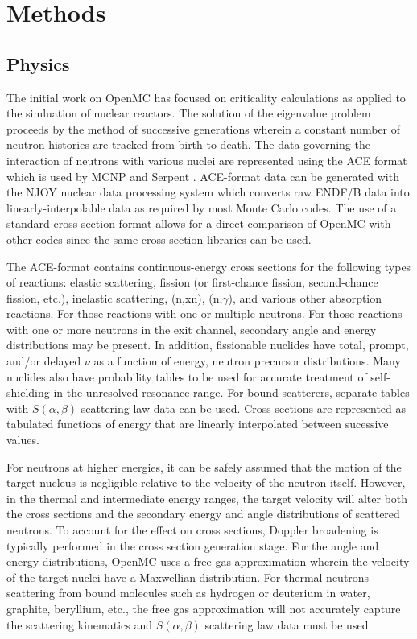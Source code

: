 \documentclass{elsarticle}
\begin{document}
\section{Methods}

\subsection{Physics}

The initial work on OpenMC has focused on criticality calculations as applied to
the simluation of nuclear reactors. The solution of the eigenvalue problem
proceeds by the method of successive generations \cite{lieberoth} wherein a
constant number of neutron histories are tracked from birth to death. The data
governing the interaction of neutrons with various nuclei are represented using
the ACE format \cite{ace-format} which is used by MCNP \cite{mcnp} and Serpent
\cite{serpent}. ACE-format data can be generated with the NJOY nuclear data
processing system which converts raw ENDF/B data into linearly-interpolable data
as required by most Monte Carlo codes. The use of a standard cross section
format allows for a direct comparison of OpenMC with other codes since the same
cross section libraries can be used.

The ACE-format contains continuous-energy cross sections for the following types
of reactions: elastic scattering, fission (or first-chance fission,
second-chance fission, etc.), inelastic scattering, (n,xn), (n,$\gamma$), and
various other absorption reactions. For those reactions with one or multiple
neutrons. For those reactions with one or more neutrons in the exit channel,
secondary angle and energy distributions may be present. In addition,
fissionable nuclides have total, prompt, and/or delayed $\nu$ as a function of
energy, neutron precursor distributions. Many nuclides also have probability
tables to be used for accurate treatment of self-shielding in the unresolved
resonance range. For bound scatterers, separate tables with $S(\alpha,\beta)$
scattering law data can be used. Cross sections are represented as tabulated
functions of energy that are linearly interpolated between sucessive values.

For neutrons at higher energies, it can be safely assumed that the motion of the
target nucleus is negligible relative to the velocity of the neutron
itself. However, in the thermal and intermediate energy ranges, the target
velocity will alter both the cross sections and the secondary energy and angle
distributions of scattered neutrons. To account for the effect on cross
sections, Doppler broadening is typically performed in the cross section
generation stage. For the angle and energy distributions, OpenMC uses a free gas
approximation \cite{freegas} wherein the velocity of the target nuclei have a
Maxwellian distribution. For thermal neutrons scattering from bound molecules
such as hydrogen or deuterium in water, graphite, beryllium, etc., the free gas
approximation will not accurately capture the scattering kinematics and
$S(\alpha,\beta)$ scattering law data must be used.
\end{document}
